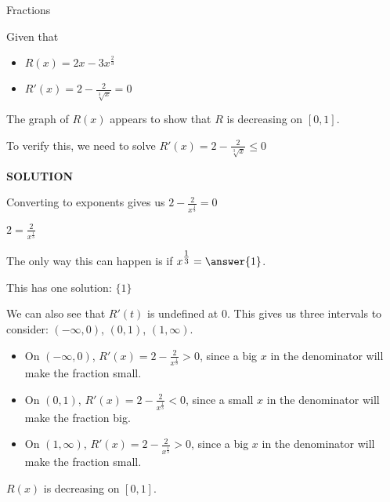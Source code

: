 \documentclass{ximera}
\begin{document}
\begin{example}  Fractions


Given that

\begin{itemize}
\item $R(x) = 2x - 3 x^{\tfrac{2}{3}}$
\item $R'(x) = 2 - \frac{2}{\sqrt[3]{x}} = 0$
\end{itemize}


The graph of $R(x)$ appears to show that $R$ is decreasing on $[0, 1]$.
\begin{center}
\end{center}










To verify this, we need to solve $R'(x) = 2 - \frac{2}{\sqrt[3]{x}}  \leq 0$



\textbf{\textcolor{purple!50!blue!90!black}{SOLUTION}}


Converting to exponents gives us $2 - \frac{2}{x^{\tfrac{1}{3}}} = 0$


$2 = \frac{2}{x^{\tfrac{1}{3}}}$

The only way this can happen is if $x^{\tfrac{1}{3}} = \answer{1}$.

This has one solution: $\{  1  \}$



We can also see that $R'(t)$ is undefined at $0$.  This gives us three intervals to consider: $(-\infty, 0)$, $(0, 1)$, $(1, \infty)$.



\begin{itemize}
\item On $(-\infty, 0)$, $R'(x) = 2 - \frac{2}{x^{\tfrac{1}{3}}} > 0$, since a big $x$ in the denominator will make the fraction small.
\item On $(0,1)$, $R'(x) = 2 - \frac{2}{x^{\tfrac{1}{3}}} < 0$, since a small $x$ in the denominator will make the fraction big.
\item On $(1,\infty)$, $R'(x) = 2 - \frac{2}{x^{\tfrac{1}{3}}} > 0$, since a big $x$ in the denominator will make the fraction small.
\end{itemize}


$R(x)$ is decreasing on $[0,1]$.

\end{example}
\end{document}

